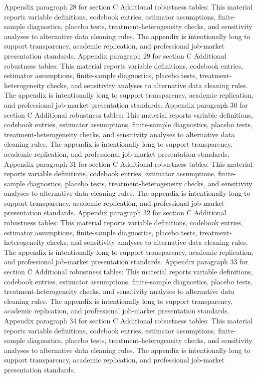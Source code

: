 \documentclass[preprint,12pt]{elsarticle}
\begin{document}
Appendix paragraph 28 for section C Additional robustness tables: This material reports variable definitions, codebook entries, estimator assumptions, finite-sample diagnostics, placebo tests, treatment-heterogeneity checks, and sensitivity analyses to alternative data cleaning rules. The appendix is intentionally long to support transparency, academic replication, and professional job-market presentation standards.
Appendix paragraph 29 for section C Additional robustness tables: This material reports variable definitions, codebook entries, estimator assumptions, finite-sample diagnostics, placebo tests, treatment-heterogeneity checks, and sensitivity analyses to alternative data cleaning rules. The appendix is intentionally long to support transparency, academic replication, and professional job-market presentation standards.
Appendix paragraph 30 for section C Additional robustness tables: This material reports variable definitions, codebook entries, estimator assumptions, finite-sample diagnostics, placebo tests, treatment-heterogeneity checks, and sensitivity analyses to alternative data cleaning rules. The appendix is intentionally long to support transparency, academic replication, and professional job-market presentation standards.
Appendix paragraph 31 for section C Additional robustness tables: This material reports variable definitions, codebook entries, estimator assumptions, finite-sample diagnostics, placebo tests, treatment-heterogeneity checks, and sensitivity analyses to alternative data cleaning rules. The appendix is intentionally long to support transparency, academic replication, and professional job-market presentation standards.
Appendix paragraph 32 for section C Additional robustness tables: This material reports variable definitions, codebook entries, estimator assumptions, finite-sample diagnostics, placebo tests, treatment-heterogeneity checks, and sensitivity analyses to alternative data cleaning rules. The appendix is intentionally long to support transparency, academic replication, and professional job-market presentation standards.
Appendix paragraph 33 for section C Additional robustness tables: This material reports variable definitions, codebook entries, estimator assumptions, finite-sample diagnostics, placebo tests, treatment-heterogeneity checks, and sensitivity analyses to alternative data cleaning rules. The appendix is intentionally long to support transparency, academic replication, and professional job-market presentation standards.
Appendix paragraph 34 for section C Additional robustness tables: This material reports variable definitions, codebook entries, estimator assumptions, finite-sample diagnostics, placebo tests, treatment-heterogeneity checks, and sensitivity analyses to alternative data cleaning rules. The appendix is intentionally long to support transparency, academic replication, and professional job-market presentation standards.
\end{document}
